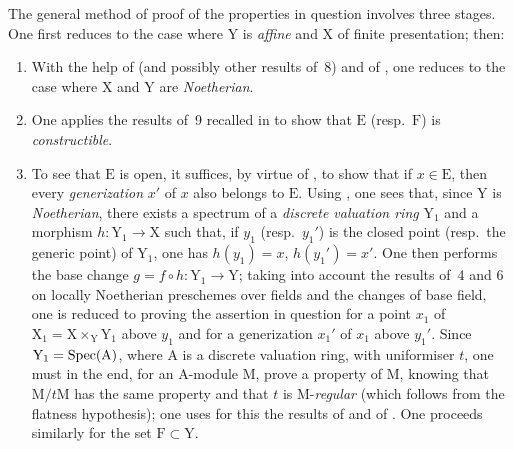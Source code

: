\begin{env}[12.0.2]
\label{IV.12.0.2}
The general method of proof of the properties in question involves three stages.
One first reduces to the case where $\mathrm{Y}$ is \emph{affine} and $\mathrm{X}$ of finite presentation; then:

\medskip
\begin{enumerate}[label=\emph{\Alph*)}]
  \item With the help of  (and possibly other results of \textsection\,8) and of , one reduces to the case where $\mathrm{X}$ and $\mathrm{Y}$ are \emph{Noetherian}.

  \item One applies the results of \textsection\,9 recalled in  to show that $\mathrm{E}$ (resp.\ $\mathrm{F}$) is \emph{constructible}.

  \item To see that $\mathrm{E}$ is open, it suffices, by virtue of , to show that if $x\in\mathrm{E}$, then every \emph{generization} $x'$ of $x$ also belongs to $\mathrm{E}$.
Using , one sees that, since $\mathrm{Y}$ is \emph{Noetherian}, there exists a spectrum of a \emph{discrete valuation ring} $\mathrm{Y}_1$ and a morphism $h:\mathrm{Y}_1\to\mathrm{X}$ such that, if $y_1$ (resp.\ $y_1'$) is the closed point (resp.\ the generic point) of $\mathrm{Y}_1$, one has $h(y_1)=x$, $h(y_1')=x'$.
One then performs the base change $g=f\circ h:\mathrm{Y}_1\to\mathrm{Y}$; taking into account the results of \textsection\textsection\,4 and 6 on locally Noetherian preschemes over fields and the changes of base field, one is reduced to proving the assertion in question for a point $x_1$ of $\mathrm{X}_1=\mathrm{X}\times_{\mathrm{Y}}\mathrm{Y}_1$ above $y_1$ and for a generization $x_1'$ of $x_1$ above $y_1'$.
Since $\mathrm{Y}_1=\operatorname{Spec}(\mathrm{A})$, where $\mathrm{A}$ is a discrete valuation ring, with uniformiser $t$, one must in the end, for an $\mathrm{A}$-module $\mathrm{M}$, prove a property of $\mathrm{M}$, knowing that $\mathrm{M}/t\mathrm{M}$ has the same property and that $t$ is $\mathrm{M}$-\emph{regular} (which follows from the flatness hypothesis); one uses for this the results of  and of .
One proceeds similarly for the set $\mathrm{F}\subset\mathrm{Y}$.
\end{enumerate}
\end{env}


